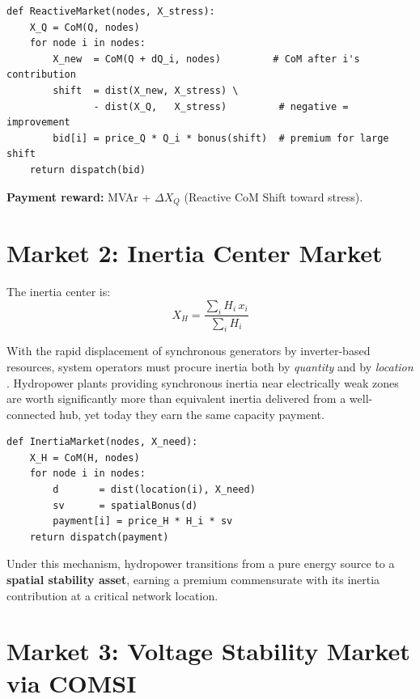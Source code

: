 \documentclass[12pt, a4paper]{article}
\begin{document}
\begin{lstlisting}[caption={Reactive Center Market dispatch},
                   label={lst:reactive}]
def ReactiveMarket(nodes, X_stress):
    X_Q = CoM(Q, nodes)
    for node i in nodes:
        X_new  = CoM(Q + dQ_i, nodes)         # CoM after i's contribution
        shift  = dist(X_new, X_stress) \
               - dist(X_Q,   X_stress)         # negative = improvement
        bid[i] = price_Q * Q_i * bonus(shift)  # premium for large shift
    return dispatch(bid)
\end{lstlisting}

\textbf{Payment reward:} MVAr + $\Delta X_Q$ (Reactive CoM Shift toward stress).

\section{Market 2: Inertia Center Market}
\label{sec:inertia_market}

The inertia center is:
\begin{equation}
  X_H = \frac{\sum_i H_i\, x_i}{\sum_i H_i}
\end{equation}

With the rapid displacement of synchronous generators by inverter-based
resources, system operators must procure inertia both by \emph{quantity} and
by \emph{location} \citep{milano2018inertia}.
Hydropower plants providing synchronous inertia near electrically weak zones
are worth significantly more than equivalent inertia delivered from a
well-connected hub, yet today they earn the same capacity payment.

\begin{lstlisting}[caption={Inertia Center Market dispatch},
                   label={lst:inertia}]
def InertiaMarket(nodes, X_need):
    X_H = CoM(H, nodes)
    for node i in nodes:
        d       = dist(location(i), X_need)
        sv      = spatialBonus(d)
        payment[i] = price_H * H_i * sv
    return dispatch(payment)
\end{lstlisting}

Under this mechanism, hydropower transitions from a pure energy source to a
\textbf{spatial stability asset}, earning a premium commensurate with its
inertia contribution at a critical network location.

\section{Market 3: Voltage Stability Market via COMSI}
\label{sec:voltage_market}
\end{document}
